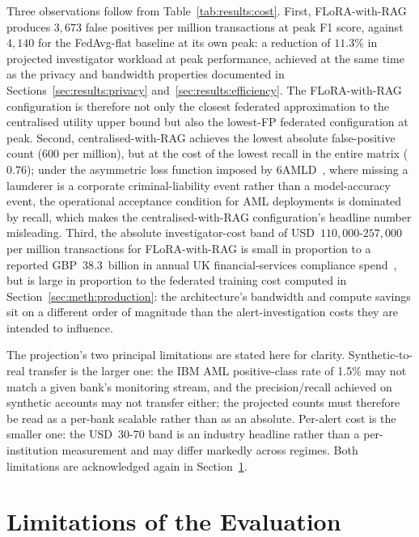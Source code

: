 \documentclass{report}
\begin{document}
Three observations follow from Table~\ref{tab:results:cost}. First, FLoRA-with-RAG produces $3{,}673$ false positives per million transactions at peak F1 score, against $4{,}140$ for the FedAvg-flat baseline at its own peak: a reduction of $11.3\%$ in projected investigator workload at peak performance, achieved at the same time as the privacy and bandwidth properties documented in Sections~\ref{sec:results:privacy} and~\ref{sec:results:efficiency}. The FLoRA-with-RAG configuration is therefore not only the closest federated approximation to the centralised utility upper bound but also the lowest-FP federated configuration at peak. Second, centralised-with-RAG achieves the lowest absolute false-positive count ($600$ per million), but at the cost of the lowest recall in the entire matrix ($0.76$); under the asymmetric loss function imposed by 6AMLD~\cite{eu6amld2018}, where missing a launderer is a corporate criminal-liability event rather than a model-accuracy event, the operational acceptance condition for AML deployments is dominated by recall, which makes the centralised-with-RAG configuration's headline number misleading. Third, the absolute investigator-cost band of USD~$110{,}000$-$257{,}000$ per million transactions for FLoRA-with-RAG is small in proportion to a reported GBP~$38.3$~billion in annual UK financial-services compliance spend~\cite{lexisnexis2024costukfc}, but is large in proportion to the federated training cost computed in Section~\ref{sec:meth:production}: the architecture's bandwidth and compute savings sit on a different order of magnitude than the alert-investigation costs they are intended to influence.

The projection's two principal limitations are stated here for clarity. Synthetic-to-real transfer is the larger one: the IBM AML positive-class rate of 1.5\% may not match a given bank's monitoring stream, and the precision/recall achieved on synthetic accounts may not transfer either; the projected counts must therefore be read as a per-bank scalable rather than as an absolute. Per-alert cost is the smaller one: the USD~30-70 band is an industry headline rather than a per-institution measurement and may differ markedly across regimes. Both limitations are acknowledged again in Section~\ref{sec:results:limits}.

\section{Limitations of the Evaluation}
\label{sec:results:limits}
\end{document}
